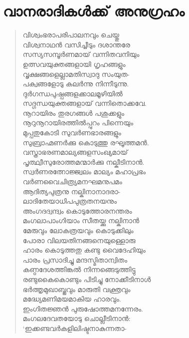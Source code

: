 
\section{വാനരാദികള്‍ക്ക് അനുഗ്രഹം}

\begin{verse}
വിശ്വംഭരാപരിപാലനവും ചെയ്തു\\
വിശ്വനാഥന്‍ വസിച്ചീടും ദശാന്തരേ\\
സസ്യസമ്പൂര്‍ണമായ് വന്നിതവനിയും\\
ഉത്സവയുക്തങ്ങളായി ഗൃഹങ്ങളും\\
വൃക്ഷങ്ങളെല്ലാമതിസ്വാദു സംയുത-\\
പക്വങ്ങളോടു കലര്‍ന്നു നിന്നീടുന്നു.\\
ദുര്‍ഗന്ധപുഷ്പങ്ങളക്കാലമൂഴിയില്‍\\
സദ്ഗന്ധയുക്തങ്ങളായ് വന്നിതൊക്കവേ.\\
നൂറായിരം തുരഗങ്ങള്‍ പശുക്കളും\\
നൂറുനൂറായിരത്തില്‍പ്പുറം പിന്നെയും\\
മുപ്പതുകോടി സുവര്‍ണഭാരങ്ങളും\\
സുബ്രാഹ്മണര്‍ക്കു കൊടുത്തു രഘൂത്തമന്‍.\\
വസ്ത്രാഭരണമാല്യങ്ങളസംഖ്യമായ്\\
പൃത്ഥ്വീസുരോത്തമന്മാര്‍ക്കു നല്കീടിനാന്‍.\\
സ്വര്‍ണരത്നോജ്ജ്വലം മാല്യം മഹാപ്രഭം\\
വര്‍ണവൈചിത്ര്യമനഘമനുപമം\\
ആദിത്യപുത്രനു നല്കിനാനാദരാ-\\
ലാദിതേയാധിപപുത്രതനയനും\\
അംഗദദ്വന്ദ്വം കൊടുത്തോരനന്തരം\\
മംഗലാപാംഗിയാം സീതയ്ക്കു നല്കിനാന്‍\\
മേരുവും ലോകത്രയവും കൊടുക്കിലും\\
പോരാ വിലയതിനങ്ങനെയുള്ളൊരു\\
ഹാരം കൊടുത്തതു കണ്ടു വൈദേഹിയും\\
പാരം പ്രസാദിച്ചു മന്ദസ്മിതാന്വിതം\\
കണ്ഠദേശത്തിങ്കല്‍ നിന്നങ്ങെടുത്തിട്ടു\\
രണ്ടുകൈകൊണ്ടും പിടിച്ചു നോക്കീടിനാള്‍\\
ഭര്‍ത്തൃമുഖാബ്ജവും മാരുതി വക്ത്രവും\\
മദ്ധ്യേമണിമയമാകിയ ഹാരവും.\\
ഇംഗിതജ്ഞന്‍ പുരുഷോത്തമനന്നേരം.\\
മംഗലദേവതയോടു ചൊല്ലീടിനാന്‍:\\
‘ഇക്കണ്ടവര്‍കളിലിഷ്ടനാകുന്നതാ-\\

\end{verse}
